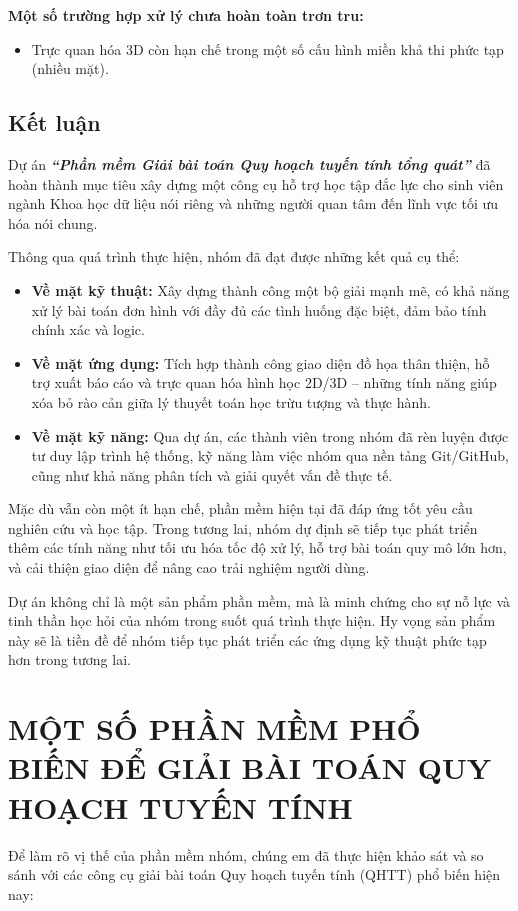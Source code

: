 \documentclass[12pt,a4paper]{article}
\begin{document}
\medskip
\noindent\textbf{Một số trường hợp xử lý chưa hoàn toàn trơn tru:}
\begin{itemize}[label=\textcolor{secondary}{$\bullet$}, itemsep=1pt]
    \item Trực quan hóa 3D còn hạn chế trong một số cấu hình miền khả thi phức tạp (nhiều mặt).
\end{itemize}

\subsection{Kết luận}
Dự án \textit{\textbf{“Phần mềm Giải bài toán Quy hoạch tuyến tính tổng quát”}} đã hoàn thành mục tiêu xây dựng một công cụ hỗ trợ học tập đắc lực cho sinh viên ngành Khoa học dữ liệu nói riêng và những người quan tâm đến lĩnh vực tối ưu hóa nói chung.

Thông qua quá trình thực hiện, nhóm đã đạt được những kết quả cụ thể:
\begin{itemize}[label=\textcolor{primary}{$\checkmark$}]
    \item \textbf{Về mặt kỹ thuật:} Xây dựng thành công một bộ giải mạnh mẽ, có khả năng xử lý bài toán đơn hình với đầy đủ các tình huống đặc biệt, đảm bảo tính chính xác và logic.
    \item \textbf{Về mặt ứng dụng:} Tích hợp thành công giao diện đồ họa thân thiện, hỗ trợ xuất báo cáo và trực quan hóa hình học 2D/3D – những tính năng giúp xóa bỏ rào cản giữa lý thuyết toán học trừu tượng và thực hành.
    \item \textbf{Về mặt kỹ năng:} Qua dự án, các thành viên trong nhóm đã rèn luyện được tư duy lập trình hệ thống, kỹ năng làm việc nhóm qua nền tảng Git/GitHub, cũng như khả năng phân tích và giải quyết vấn đề thực tế.
\end{itemize}

Mặc dù vẫn còn một ít hạn chế, phần mềm hiện tại đã đáp ứng tốt yêu cầu nghiên cứu và học tập. Trong tương lai, nhóm dự định sẽ tiếp tục phát triển thêm các tính năng như tối ưu hóa tốc độ xử lý, hỗ trợ bài toán quy mô lớn hơn, và cải thiện giao diện để nâng cao trải nghiệm người dùng.

Dự án không chỉ là một sản phẩm phần mềm, mà là minh chứng cho sự nỗ lực và tinh thần học hỏi của nhóm trong suốt quá trình thực hiện. Hy vọng sản phẩm này sẽ là tiền đề để nhóm tiếp tục phát triển các ứng dụng kỹ thuật phức tạp hơn trong tương lai.

\newpage
\section{MỘT SỐ PHẦN MỀM PHỔ BIẾN ĐỂ GIẢI BÀI TOÁN QUY HOẠCH TUYẾN TÍNH}
Để làm rõ vị thế của phần mềm nhóm, chúng em đã thực hiện khảo sát và so sánh với các công cụ giải bài toán Quy hoạch tuyến tính (QHTT) phổ biến hiện nay:
\end{document}
